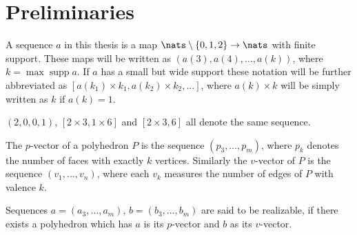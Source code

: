 \section{Preliminaries}

\begin{definition}[Sequence]
  A sequence $a$ in this thesis is a map $\nats \setminus \{0, 1, 2\} \rightarrow \nats$ with finite support. These maps will be written as $(a(3), a(4), ..., a(k))$, where $k = \operatorname{max} \operatorname{supp} a$. If $a$ has a small but wide support these notation will be further abbreviated as $[a(k_1) \times k_1, a(k_2) \times k_2, ...]$, where $a(k) \times k$ will be simply written as $k$ if $a(k) = 1$.
\end{definition}
\begin{example}
  $(2, 0, 0, 1)$, $[2 \times 3, 1 \times 6]$ and $[2 \times 3, 6]$ all denote the same sequence. 
\end{example}
\begin{definition}\label{def:relizable}
  The $p$-vector of a polyhedron $P$ is the sequence $(p_3, \dots, p_m)$, where $p_k$ denotes the number of faces with exactly $k$ vertices. Similarly the $v$-vector of $P$ is the sequence $(v_1, \dots, v_n)$, where each $v_k$ measures the number of edges of $P$ with valence $k$. 
\end{definition}

\begin{definition}\label{def:realizable}
Sequences $a = (a_3, \dots, a_m)$, $b = (b_3, \dots, b_m)$ are said to be realizable, if there exists a polyhedron which has $a$ is its $p$-vector and $b$ as its $v$-vector.
\end{definition}

